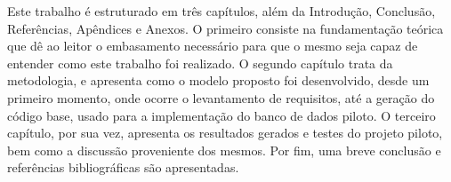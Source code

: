 Este trabalho é estruturado em três capítulos, além da Introdução, Conclusão, Referências, Apêndices e Anexos. O primeiro consiste na fundamentação teórica que dê ao leitor o embasamento necessário para que o mesmo seja capaz de entender como este trabalho foi realizado. O segundo capítulo trata da metodologia, e apresenta como o modelo proposto foi desenvolvido, desde um primeiro momento, onde ocorre o levantamento de requisitos, até a geração do código base, usado para a implementação do banco de dados piloto. O terceiro capítulo, por sua vez, apresenta os resultados gerados e testes do projeto piloto, bem como a discussão proveniente dos mesmos. Por fim, uma breve conclusão e referências bibliográficas são apresentadas.